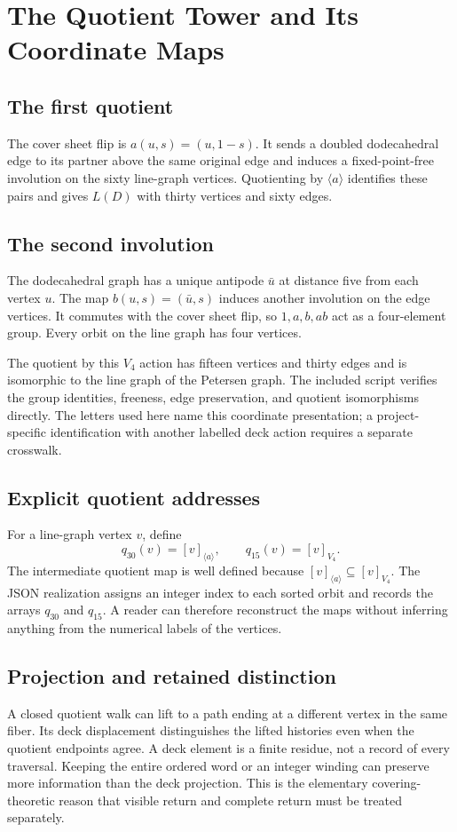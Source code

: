 \section{The Quotient Tower and Its Coordinate Maps}
\label{app:tower}
\subsection{The first quotient}
The cover sheet flip is $a(u,s)=(u,1-s)$. It sends a doubled dodecahedral edge to its partner above the same original edge and induces a fixed-point-free involution on the sixty line-graph vertices. Quotienting by $\langle a\rangle$ identifies these pairs and gives $L(D)$ with thirty vertices and sixty edges.

\subsection{The second involution}
The dodecahedral graph has a unique antipode $\bar u$ at distance five from each vertex $u$. The map $b(u,s)=(\bar u,s)$ induces another involution on the edge vertices. It commutes with the cover sheet flip, so $1,a,b,ab$ act as a four-element group. Every orbit on the line graph has four vertices.

The quotient by this $V_4$ action has fifteen vertices and thirty edges and is isomorphic to the line graph of the Petersen graph. The included script verifies the group identities, freeness, edge preservation, and quotient isomorphisms directly. The letters used here name this coordinate presentation; a project-specific identification with another labelled deck action requires a separate crosswalk.

\subsection{Explicit quotient addresses}
For a line-graph vertex $v$, define
\[
q_{30}(v)=[v]_{\langle a\rangle},
\qquad q_{15}(v)=[v]_{V_4}.
\]
The intermediate quotient map is well defined because $[v]_{\langle a\rangle}\subseteq[v]_{V_4}$. The JSON realization assigns an integer index to each sorted orbit and records the arrays $q_{30}$ and $q_{15}$. A reader can therefore reconstruct the maps without inferring anything from the numerical labels of the vertices.

\subsection{Projection and retained distinction}
A closed quotient walk can lift to a path ending at a different vertex in the same fiber. Its deck displacement distinguishes the lifted histories even when the quotient endpoints agree. A deck element is a finite residue, not a record of every traversal. Keeping the entire ordered word or an integer winding can preserve more information than the deck projection. This is the elementary covering-theoretic reason that visible return and complete return must be treated separately.
